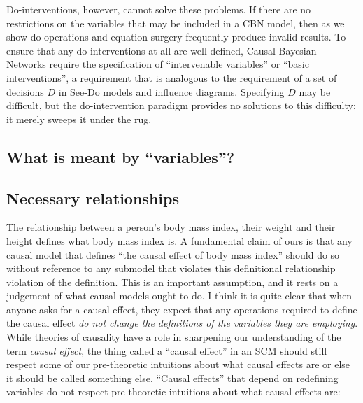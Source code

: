 Do-interventions, however, cannot solve these problems. If there are no restrictions on the variables that may be included in a CBN model, then as we show do-operations and equation surgery frequently produce invalid results. To ensure that any do-interventions at all are well defined, Causal Bayesian Networks require the specification of ``intervenable variables'' or ``basic interventions'', a requirement that is analogous to the requirement of a set of decisions $D$ in See-Do models and influence diagrams. Specifying $D$ may be difficult, but the do-intervention paradigm provides no solutions to this difficulty; it merely sweeps it under the rug.

\subsection{What is meant by ``variables''?}




\subsection{Necessary relationships}

The relationship between a person's body mass index, their weight and their height defines what body mass index is. A fundamental claim of ours is that any causal model that defines ``the causal effect of body mass index'' should do so without reference to any submodel that violates this definitional relationship violation of the definition. This is an important assumption, and it rests on a judgement of what causal models ought to do. I think it is quite clear that when anyone asks for a causal effect, they expect that any operations required to define the causal effect \emph{do not change the definitions of the variables they are employing}. While theories of causality have a role in sharpening our understanding of the term \emph{causal effect}, the thing called a ``causal effect'' in an SCM should still respect some of our pre-theoretic intuitions about what causal effects are or else it should be called something else. ``Causal effects'' that depend on redefining variables do not respect pre-theoretic intuitions about what causal effects are:

